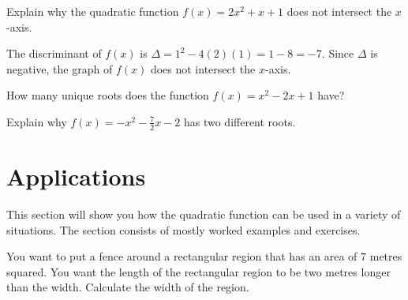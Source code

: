 \documentclass[a4paper,oneside,12pt]{article}
\begin{document}
\begin{example}
Explain why the quadratic function $f(x) = 2x^2 + x + 1$ does not
intersect the $x$-axis.
\end{example}

\begin{solution}
The discriminant of $f(x)$ is
$\Delta = 1^2 - 4(2)(1) = 1 - 8 = -7$.  Since $\Delta$ is negative,
the graph of $f(x)$ does not intersect the $x$-axis.
\end{solution}

\begin{exercise}
How many unique roots does the function $f(x) = x^2 - 2x + 1$ have?
\end{exercise}

\begin{exercise}
Explain why $f(x) = -x^2 - \frac{7}{2}x - 2$ has two different roots.
\end{exercise}



\section{Applications}

This section will show you how the quadratic function can be used in a
variety of situations.  The section consists of mostly worked examples
and exercises.

\begin{example}
\label{ex:fence_a_rectangular_region}
You want to put a fence around a rectangular region that has an area
of $7$ metres squared.  You want the length of the rectangular region
to be two metres longer than the width.  Calculate the width of the
region.
\end{example}
\end{document}
